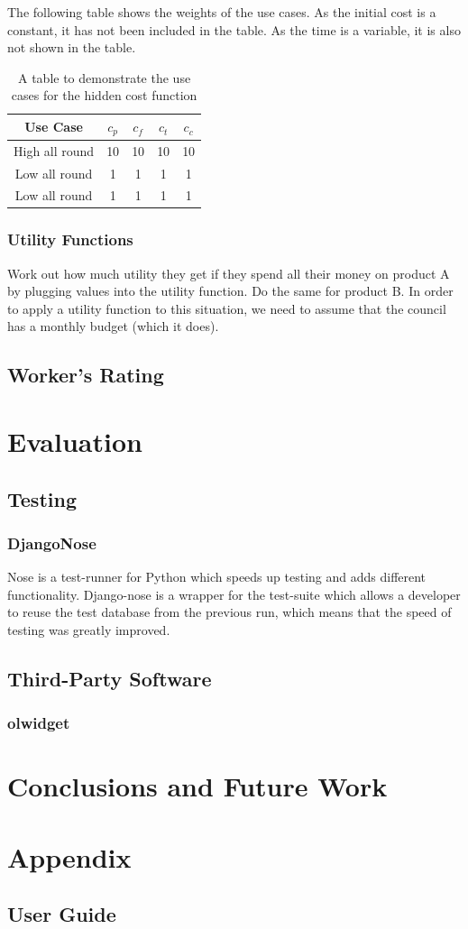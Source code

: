 The following table shows the weights of the use cases. As the initial cost is a constant, it has not been included in the table. As the time is a variable, it is also not shown in the table.

\begin{table}
\centering
\begin{tabular}{c|cccc}
\textbf{Use Case} & $c_p$ & $c_f$ & $c_t$ & $c_c$ \\
\hline
High all round & 10 & 10 & 10 & 10 \\
Low all round & 1 & 1 & 1 & 1 \\
Low all round & 1 & 1 & 1 & 1 \\
\end{tabular}
\caption{A table to demonstrate the use cases for the hidden cost function}
\label{tab:hiddencost}
\end{table}

\subsection{Utility Functions}
Work out how much utility they get if they spend all their money on product A by plugging values into the utility function. Do the same for product B. In order to apply a utility function to this situation, we need to assume that the council has a monthly budget (which it does). 

\section{Worker's Rating}
\chapter*{Evaluation}
\section{Testing}
\subsection{DjangoNose}
Nose is a test-runner for Python which speeds up testing and adds different functionality. Django-nose is a wrapper for the test-suite which allows a developer to reuse the test database from the previous run, which means that the speed of testing was greatly improved.
\section*{Third-Party Software}
\subsection*{olwidget}
\label{sec:thirdparty}
\chapter*{Conclusions and Future Work}
\chapter*{Appendix}
\section*{User Guide}